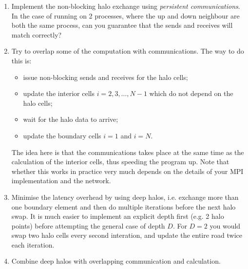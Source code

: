 \documentclass{article}
\begin{document}
\begin{enumerate}
\item Implement the non-blocking halo exchange using {\em persistent
  communications}. In the case of running on 2 processes, where the up
  and down neighbour are both the same process, can you guarantee that
  the sends and receives will match correctly?

\item Try to overlap some of the computation with communications. The
  way to do this is:

  \begin{itemize}
  \item issue non-blocking sends and receives for the halo cells;
   \item update the interior cells $i = 2, 3, \ldots, N-1$ which do not depend on the halo cells;
   \item wait for the halo data to arrive;
   \item update the boundary cells $i=1$ and $i=N$.
  \end{itemize}

  The idea here is that the communications takes place at the same
  time as the calculation of the interior cells, thus speeding the
  program up. Note that whether this works in practice very much
  depends on the details of your MPI implementation and the network.

\item Minimise the latency overhead by using deep halos, i.e. exchange
  more than one boundary element and then do multiple iterations
  before the next halo swap. It is much easier to implement an
  explicit depth first (e.g. 2 halo points) before attempting the
  general case of depth $D$. For $D=2$ you would swap two halo cells
  every second interation, and update the entire road twice each
  iteration.

\item Combine deep halos with overlapping communication and calculation.



\end{enumerate}
\end{document}
